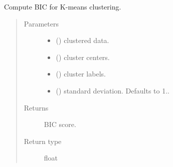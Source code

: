 \documentclass[letterpaper,10pt,english]{sphinxmanual}
\begin{document}
\begin{fulllineitems}
\label{\detokenize{_modules/cosifer.utils:cosifer.utils.vector_quantization.k_means_bic}}
Compute BIC for K-means clustering.
\begin{quote}\begin{description}
\item[{Parameters}] \leavevmode\begin{itemize}
\item {} 
 () \textendash{} clustered data.

\item {} 
 () \textendash{} cluster centers.

\item {} 
 () \textendash{} cluster labels.

\item {} 
 (\sphinxstyleliteralemphasis{\sphinxupquote{, }}) \textendash{} standard deviation. Defaults to 1..

\end{itemize}

\item[{Returns}] \leavevmode
BIC score.

\item[{Return type}] \leavevmode
float

\end{description}\end{quote}

\end{fulllineitems}

\end{document}

